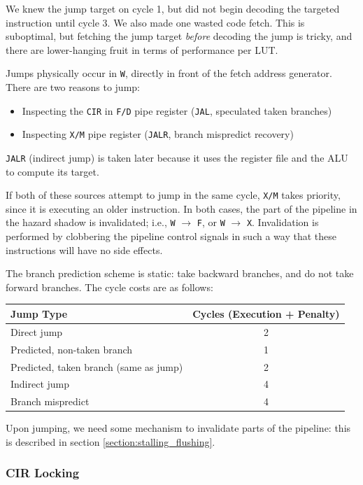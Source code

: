 We knew the jump target on cycle 1, but did not begin decoding the targeted instruction until cycle 3. We also made one wasted code fetch. This is suboptimal, but fetching the jump target {\it before} decoding the jump is tricky, and there are lower-hanging fruit in terms of performance per LUT.

Jumps physically occur in {\tt W}, directly in front of the fetch address generator. There are two reasons to jump:

\begin{itemize}
	\item Inspecting the {\tt CIR} in {\tt F/D} pipe register ({\tt JAL}, speculated taken branches)
	\item Inspecting {\tt X/M} pipe register ({\tt JALR}, branch mispredict recovery)
\end{itemize}

{\tt JALR} (indirect jump) is taken later because it uses the register file and the ALU to compute its target.

If both of these sources attempt to jump in the same cycle, {\tt X/M} takes priority, since it is executing an older instruction. In both cases, the part of the pipeline in the hazard shadow is invalidated; i.e., {\tt W} $\to$ {\tt F}, or {\tt W} $\to$ {\tt X}. Invalidation is performed by clobbering the pipeline control signals in such a way that these instructions will have no side effects.

The branch prediction scheme is static: take backward branches, and do not take forward branches. The cycle costs are as follows:

\begin{center}
\begin{tabular}{l c}
\hline
Jump Type & Cycles (Execution + Penalty) \\
\hline
Direct jump & 2 \\
Predicted, non-taken branch & 1 \\
Predicted, taken branch (same as jump) & 2 \\
Indirect jump & 4 \\
Branch mispredict & 4 \\
\hline
\end{tabular}
\end{center}

Upon jumping, we need some mechanism to invalidate parts of the pipeline: this is described in section \ref{section:stalling_flushing}.

\subsubsection{CIR Locking}

